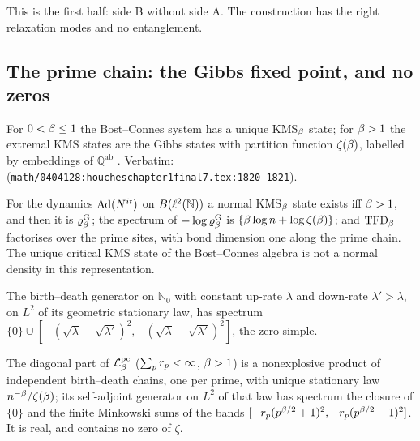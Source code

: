 This is the first half: side B without side A. The construction has the right relaxation
modes and no entanglement.

\subsection{The prime chain: the Gibbs fixed point, and no zeros}

\begin{citedfact}
\label{cit:bc-kms-unique}
For $0<\beta\le1$ the Bost--Connes system has a unique KMS$_\beta$ state; for
$\beta>1$ the extremal KMS states are the Gibbs states with partition function
$\zeta(\beta)$, labelled by embeddings of $\mathbb Q^{\mathrm{ab}}$
\cite{connesmarcolli2004physics,bostconnes1995}.
Verbatim: \texttt{} (\texttt{math/0404128:houcheschapter1final7.tex:1820-1821}).
\end{citedfact}

\begin{proposition}
\label{prop:normal-kms-gibbs}
For the dynamics $\operatorname{Ad}(N^{it})$ on $B(\ell^2(\mathbb N))$ a normal KMS$_\beta$ state
exists iff $\beta>1$, and then it is $\varrho^{\mathrm{G}}_{\beta}$; the spectrum of
$-\log\varrho^{\mathrm{G}}_{\beta}$ is $\{\beta\log n + \log\zeta(\beta)\}$; and $\mathrm{TFD}_{\beta}$
factorises over the prime sites, with bond dimension one along the prime chain. The
unique critical KMS state of the Bost--Connes algebra is not a normal density in this
representation.
\end{proposition}

\begin{lemma}[M/M/1 spectrum]
\label{lem:mm1-spectrum}
The birth--death generator on $\mathbb N_0$ with constant up-rate $\lambda$ and down-rate
$\lambda'>\lambda$, on $L^2$ of its geometric stationary law, has spectrum $\{0\}\cup
[-(\sqrt\lambda+\sqrt{\lambda'})^2,-(\sqrt\lambda-\sqrt{\lambda'})^2]$, the zero simple.
\end{lemma}

\begin{proposition}
\label{prop:prime-chain-lindbladian}
The diagonal part of $\mathcal L^{\mathrm{pc}}_{\beta}$ ($\sum_{p}r_{p}<\infty$, $\beta>1$) is a
nonexplosive product of independent birth--death chains, one per prime, with unique
stationary law $n^{-\beta}/\zeta(\beta)$; its self-adjoint generator on $L^2$ of
that law has spectrum the closure of $\{0\}$ and the finite Minkowski sums of the bands
$[-r_{p}(p^{\beta/2}+1)^2,-r_{p}(p^{\beta/2}-1)^2]$. It is real, and contains
no zero of $\zeta$.
\end{proposition}

